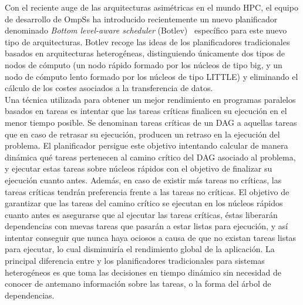 
Con el reciente auge de las arquitecturas asimétricas en el mundo HPC, el
equipo de desarrollo de OmpSs ha introducido recientemente un nuevo
planificador denominado \emph{Bottom level-aware scheduler}
(Botlev)~\cite{botlev} específico para este nuevo tipo de
arquitecturas. Botlev recoge las ideas de los planificadores tradicionales
basados en arquitecturas heterogéneas, distinguiendo únicamente dos tipos
de nodos de cómputo (un nodo rápido formado por los núcleos de tipo big, y un
nodo de cómputo lento formado por los núcleos de tipo LITTLE) y eliminando el
cálculo de los costes asociados a
la transferencia de datos. \\

Una técnica utilizada para obtener un mejor rendimiento en programas
paralelos basados en tareas es intentar que las tareas críticas finalicen
su ejecución en el menor tiempo posible. Se denominan tareas críticas de un
DAG a aquellas tareas que en caso de retrasar su ejecución, producen un
retraso en la ejecución del problema. El planificador \botlev persigue este
objetivo intentando calcular de manera dinámica qué tareas pertenecen al
camino crítico del DAG asociado al problema, y ejecutar estas tareas sobre
núcleos rápidos con el objetivo de finalizar su ejecución cuanto
antes. Además, en caso de existir más tareas no críticas, las tareas
críticas tendrán preferencia frente a las tareas no críticas. El objetivo
de garantizar que las tareas del camino crítico se ejecutan en los núcleos
rápidos cuanto antes es asegurarse que al ejecutar las tareas críticas,
éstas liberarán dependencias con nuevas tareas que pasarán a estar listas
para ejecución, y así intentar conseguir que nunca haya \wts ociosos a
causa de que no existan tareas listas para ejecutar, lo cual disminuiría el
rendimiento global de la aplicación. La principal diferencia entre \botlev
y los planificadores tradicionales para sistemas heterogéneos es que
\botlev toma las decisiones en tiempo dinámico sin necesidad de conocer de
antemano información sobre las tareas, o la forma del árbol de
dependencias.

